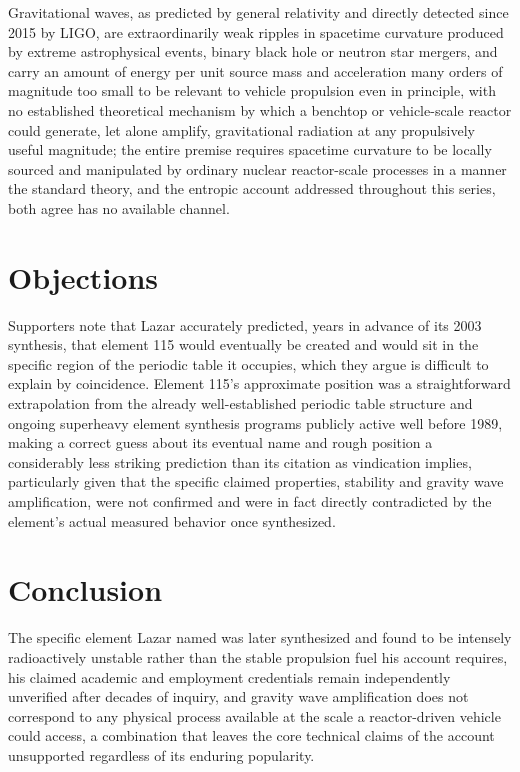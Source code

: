 \documentclass[11pt]{article}
\begin{document}
Gravitational waves, as predicted by general relativity and directly detected since 2015 by LIGO, are extraordinarily weak ripples in spacetime curvature produced by extreme astrophysical events, binary black hole or neutron star mergers, and carry an amount of energy per unit source mass and acceleration many orders of magnitude too small to be relevant to vehicle propulsion even in principle, with no established theoretical mechanism by which a benchtop or vehicle-scale reactor could generate, let alone amplify, gravitational radiation at any propulsively useful magnitude; the entire premise requires spacetime curvature to be locally sourced and manipulated by ordinary nuclear reactor-scale processes in a manner the standard theory, and the entropic account addressed throughout this series, both agree has no available channel.

\section{Objections}

Supporters note that Lazar accurately predicted, years in advance of its 2003 synthesis, that element 115 would eventually be created and would sit in the specific region of the periodic table it occupies, which they argue is difficult to explain by coincidence. Element 115's approximate position was a straightforward extrapolation from the already well-established periodic table structure and ongoing superheavy element synthesis programs publicly active well before 1989, making a correct guess about its eventual name and rough position a considerably less striking prediction than its citation as vindication implies, particularly given that the specific claimed properties, stability and gravity wave amplification, were not confirmed and were in fact directly contradicted by the element's actual measured behavior once synthesized.

\section{Conclusion}

The specific element Lazar named was later synthesized and found to be intensely radioactively unstable rather than the stable propulsion fuel his account requires, his claimed academic and employment credentials remain independently unverified after decades of inquiry, and gravity wave amplification does not correspond to any physical process available at the scale a reactor-driven vehicle could access, a combination that leaves the core technical claims of the account unsupported regardless of its enduring popularity.
\end{document}
